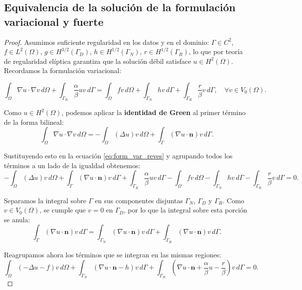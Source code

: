 \documentclass[11pt]{book}
\theoremstyle{plain} %
\theoremstyle{definition} %
\theoremstyle{definition} %
\begin{document}
\subsection{Equivalencia de la solución de la formulación variacional y fuerte}
\label{sec:equivform}
\begin{proof}
Asumimos suficiente regularidad en los datos y en el dominio: $\Gamma \in C^2$, $f \in L^2(\Omega)$, $g \in H^{3/2}(\Gamma_D)$, $h \in H^{1/2}(\Gamma_N)$, $r \in H^{1/2}(\Gamma_R)$, lo que por teoría de regularidad elíptica garantiza que la solución débil satisface $u\in H^2(\Omega)$. Recordamos la formulación variacional:

\begin{equation}
    \label{eq:form_var_reves}
    \int_{\Omega}\nabla u \cdot \nabla v\, d\Omega + \int_{\Gamma_R}\frac{\alpha}{\beta}uv\, d\Gamma = \int_{\Omega}fv \, d\Omega+\int_{\Gamma_N}hv\, d\Gamma+\int_{\Gamma_R}\frac{r}{\beta}v\, d\Gamma, \quad \forall v \in V_0(\Omega).
\end{equation}

Como $u\in H^2(\Omega)$, podemos aplicar la \textbf{identidad de Green} al primer término de la forma bilineal:
\begin{equation*}
     \int_{\Omega}\nabla u \cdot \nabla v\, d\Omega = -\int_\Omega (\Delta u)v \, d\Omega + \int_{\Gamma} (\nabla u \cdot \mathbf{n})v \, d\Gamma.
\end{equation*}

Sustituyendo esto en la ecuación \eqref{eq:form_var_reves} y agrupando todos los términos a un lado de la igualdad obtenemos:
\begin{equation*}
    -\int_\Omega (\Delta u)v \, d\Omega + \int_{\Gamma} (\nabla u \cdot \mathbf{n})v \, d\Gamma + \int_{\Gamma_R}\frac{\alpha}{\beta}uv\, d\Gamma -\int_{\Omega}fv \, d\Omega-\int_{\Gamma_N}hv\, d\Gamma-\int_{\Gamma_R}\frac{r}{\beta}v\, d\Gamma = 0.
\end{equation*}

Separamos la integral sobre $\Gamma$ en sus componentes disjuntas $\Gamma_N$, $\Gamma_D$ y $\Gamma_R$. Como $v\in V_0(\Omega)$, se cumple que $v=0$ en $\Gamma_D$, por lo que la integral sobre esta porción se anula:
\begin{equation*}
    \int_{\Gamma} (\nabla u \cdot \mathbf{n})v \, d\Gamma = \int_{\Gamma_N}  (\nabla u \cdot \mathbf{n})v \, d\Gamma + \int_{\Gamma_R}  (\nabla u \cdot \mathbf{n})v \, d\Gamma.
\end{equation*}

Reagrupamos ahora los términos que se integran en las mismas regiones:
\begin{equation*}
    \int_\Omega(-\Delta u- f)v \, d\Omega + \int_{\Gamma_N}(\nabla u \cdot \mathbf{n} -h)v \, d\Gamma +\int_{\Gamma_R} \left(\nabla u \cdot \mathbf{n} + \frac{\alpha}{\beta}u -\frac{r}{\beta}\right)v \, d\Gamma = 0.
\end{equation*}


\end{proof}
\end{document}
